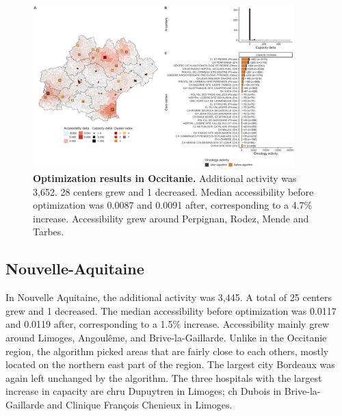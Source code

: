 \begin{figure}[H]
    \includegraphics[width=0.9\textwidth]{images/camion/optim_region/optim_Occitanie.png}
    \centering
    \caption{ \textbf{Optimization results in Occitanie.} Additional activity
        was 3,652. 28 centers grew and 1 decreased. Median accessibility before
        optimization was 0.0087 and 0.0091 after, corresponding to a 4.7\%
        increase. Accessibility grew around Perpignan, Rodez, Mende and Tarbes.
    }
\end{figure}

\subsection*{Nouvelle-Aquitaine}

In Nouvelle Aquitaine, the additional activity was 3,445. A total of 25 centers
grew and 1 decreased. The median accessibility before optimization was 0.0117 and
0.0119 after, corresponding to a 1.5\% increase. Accessibility mainly grew around
Limoges, Angoulême, and Brive-la-Gaillarde. Unlike in the Occitanie region,
the algorithm picked areas that are fairly close to each others, mostly located
on the northern east part of the region. The largest city Bordeaux was again
left unchanged by the algorithm. The three hospitals with the largest increase
in capacity are \ac{chru} Dupuytren in Limoges; \ac{ch} Dubois in
Brive-la-Gaillarde and Clinique François Chenieux in Limoges.

